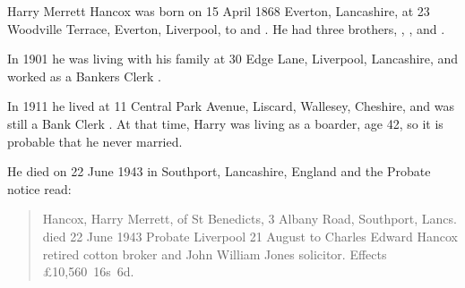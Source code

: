 
Harry Merrett Hancox was born on 15 April 1868 	Everton, Lancashire, at 23 Woodville Terrace, Everton, Liverpool, to  and .\cite{HMHancoxBirth}
He had three brothers, , , and .

In 1901 he was living with his family at 30 Edge Lane, Liverpool, Lancashire, and worked as a Bankers Clerk \cite{HMHancoxOccupation}.

In 1911 he lived at 11 Central Park Avenue, Liscard, Wallesey, Cheshire, and was still a Bank Clerk \cite{HMHancoxResidence}. At that time, Harry was living as a boarder, age 42, so it is probable that he never married. 

He died on 22 June 1943 in Southport, Lancashire, England \cite{HarryMerrettHancoxDeath} and the Probate notice read:

\begin{quotation}
Hancox, Harry Merrett, of St Benedicts, 3 Albany Road, Southport, Lancs. died 22 June 1943 Probate Liverpool 21 August to Charles Edward Hancox retired cotton broker and John William Jones solicitor. Effects \pounds10,560~16s~6d.
\end{quotation}
